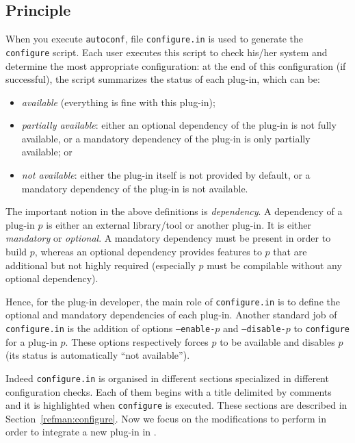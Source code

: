\subsection{Principle}\label{conf:principle}

When you execute \texttt{autoconf}, file \texttt{configure.in} is used to
generate the \texttt{configure} script. Each \framac user executes this script
to check his/her system and determine the most appropriate configuration: at the
end of this configuration (if successful), the script summarizes the
status of each plug-in, which can be:
\begin{itemize}
\item \emph{available} (everything is fine with this plug-in);
\item \emph{partially available}: either an optional dependency of the plug-in
  is not fully available, or a mandatory dependency of the plug-in is only
  partially available; or
\item \emph{not available}: either the plug-in itself is not provided by
  default, or a mandatory dependency of the plug-in is not available.
\end{itemize}

The important notion in the above definitions is
\emph{dependency}. A dependency of a plug-in $p$
is either an external library/tool or another
\framac plug-in. It is either \emph{mandatory} or \emph{optional}. A mandatory
dependency must be present in order to build $p$, whereas an optional
dependency provides features to $p$ that are additional but not highly required
(especially $p$ must be compilable without any optional dependency).

Hence, for the plug-in developer, the main role of \texttt{configure.in} is to
define the optional and mandatory dependencies of each plug-in. Another standard
job of \texttt{configure.in} is the addition of options \texttt{---enable-$p$}
and \texttt{---disable-$p$} to \texttt{configure} for a plug-in $p$. These
options respectively forces $p$ to be available and disables $p$ (its status is
automatically ``not available'').

Indeed \texttt{configure.in} is organised in different sections specialized in
different configuration checks. Each of them begins with a title delimited by
comments and it is highlighted when \texttt{configure} is executed. These
sections are described in Section~\ref{refman:configure}. Now we focus on
the modifications to perform in order to integrate a new plug-in in \framac.

